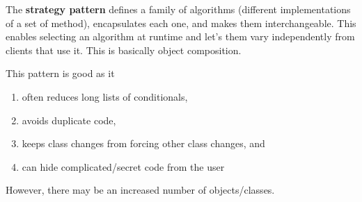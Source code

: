   \begin{definition} 
    The \textbf{strategy pattern} defines a family of algorithms (different implementations of a set of method), encapsulates each one, and makes them interchangeable. This enables selecting an algorithm at runtime and let's them vary independently from clients that use it. This is basically object composition. 
  \end{definition} 

  This pattern is good as it 
  \begin{enumerate}
    \item often reduces long lists of conditionals, 
    \item avoids duplicate code, 
    \item keeps class changes from forcing other class changes, and 
    \item can hide complicated/secret code from the user
  \end{enumerate}

  However, there may be an increased number of objects/classes. 

